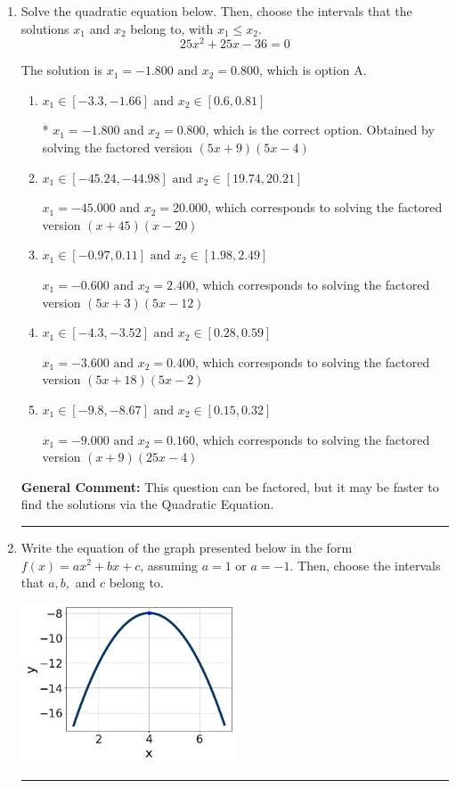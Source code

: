 \documentclass{extbook}[14pt]
\newcommand{\litem}[1]{\item #1

\rule{\textwidth}{0.4pt}}
\begin{document}
\begin{enumerate}\litem{
Solve the quadratic equation below. Then, choose the intervals that the solutions $x_1$ and $x_2$ belong to, with $x_1 \leq x_2$.
\[ 25x^{2} +25 x -36 = 0 \]

The solution is \( x_1 = -1.800 \text{ and } x_2 = 0.800 \), which is option A.\begin{enumerate}[label=\Alph*.]
\item \( x_1 \in [-3.3, -1.66] \text{ and } x_2 \in [0.6, 0.81] \)

* $x_1 = -1.800 \text{ and } x_2 = 0.800$, which is the correct option. Obtained by solving the factored version $(5x + 9)(5x -4)$
\item \( x_1 \in [-45.24, -44.98] \text{ and } x_2 \in [19.74, 20.21] \)

$x_1 = -45.000 \text{ and } x_2 = 20.000$, which corresponds to solving the factored version $(x + 45)(x -20)$
\item \( x_1 \in [-0.97, 0.11] \text{ and } x_2 \in [1.98, 2.49] \)

$x_1 = -0.600 \text{ and } x_2 = 2.400$, which corresponds to solving the factored version $(5x + 3)(5x -12)$
\item \( x_1 \in [-4.3, -3.52] \text{ and } x_2 \in [0.28, 0.59] \)

$x_1 = -3.600 \text{ and } x_2 = 0.400$, which corresponds to solving the factored version $(5x + 18)(5x -2)$
\item \( x_1 \in [-9.8, -8.67] \text{ and } x_2 \in [0.15, 0.32] \)

$x_1 = -9.000 \text{ and } x_2 = 0.160$, which corresponds to solving the factored version $(x + 9)(25x -4)$
\end{enumerate}

\textbf{General Comment:} This question can be factored, but it may be faster to find the solutions via the Quadratic Equation.
}
\litem{
Write the equation of the graph presented below in the form $f(x)=ax^2+bx+c$, assuming  $a=1$ or $a=-1$. Then, choose the intervals that $a, b,$ and $c$ belong to.

\begin{center}
    \includegraphics[width=0.5\textwidth]{../Figures/quadraticGraphToEquationB.png}
\end{center}




}
\end{enumerate}
\end{document}
